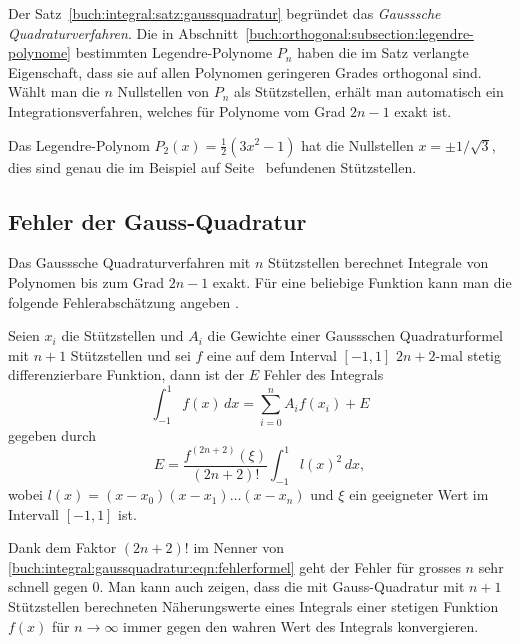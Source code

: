 Der Satz~\ref{buch:integral:satz:gaussquadratur} begründet das
{\em Gausssche Quadraturverfahren}.
Die in Abschnitt~\ref{buch:orthogonal:subsection:legendre-polynome}
bestimmten Legendre-Polynome $P_n$ haben die im Satz
verlangte Eigenschaft,
dass sie auf allen Polynomen geringeren Grades orthogonal sind.
Wählt man die $n$ Nullstellen von $P_n$ als Stützstellen, erhält man 
automatisch ein Integrationsverfahren, welches für Polynome vom Grad
$2n-1$ exakt ist.

\begin{beispiel}
Das Legendre-Polynom $P_2(x) = \frac12(3x^2-1)$ hat die
Nullstellen $x=\pm1/\sqrt{3}$, dies sind genau die im Beispiel
auf Seite~\pageref{buch:integral:beispiel:gaussquadraturn1} befundenen
Stützstellen.
\end{beispiel}

%
%
\subsection{Fehler der Gauss-Quadratur
\label{buch:orthogonal:subsection:fehler}}
Das Gausssche Quadraturverfahren mit $n$ Stützstellen berechnet
Integrale von Polynomen bis zum Grad $2n-1$ exakt.
Für eine beliebige Funktion kann man die folgende Fehlerabschätzung
angeben \cite[theorem 7.3.4, p.~497]{buch:numal}.

\begin{satz}
%
Seien $x_i$ die Stützstellen und $A_i$ die Gewichte einer
Gaussschen Quadraturformel mit $n+1$ Stützstellen und sei $f$
eine auf dem Interval $[-1,1]$ $2n+2$-mal stetig differenzierbare
Funktion, dann ist der $E$ Fehler des Integrals
\[
\int_{-1}^1 f(x)\,dx = \sum_{i=0}^n A_i f(x_i) + E
\]
gegeben durch
\begin{equation}
E = \frac{f^{(2n+2)}(\xi)}{(2n+2)!}\int_{-1}^1 l(x)^2\,dx,
\label{buch:integral:gaussquadratur:eqn:fehlerformel}
\end{equation}
wobei $l(x)=(x-x_0)(x-x_1)\dots(x-x_n)$  und $\xi$ ein geeigneter
Wert im Intervall $[-1,1]$ ist.
\end{satz}

Dank dem Faktor $(2n+2)!$ im Nenner von
\eqref{buch:integral:gaussquadratur:eqn:fehlerformel}
geht der Fehler für grosses $n$ sehr schnell gegen $0$.
Man kann auch zeigen, dass die mit Gauss-Quadratur mit $n+1$
Stützstellen berechneten Näherungswerte eines Integrals einer
stetigen Funktion $f(x)$ für $n\to\infty$ immer gegen den wahren
Wert des Integrals konvergieren.

